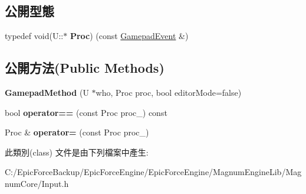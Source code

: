 \subsection*{公開型態}
\begin{DoxyCompactItemize}
\item 
typedef void(U\+::$\ast$ {\bfseries Proc}) (const \hyperlink{class_magnum_1_1_input_1_1_gamepad_event}{Gamepad\+Event} \&)\hypertarget{class_magnum_1_1_input_1_1_gamepad_method_a84febdcd685fe1849f89a8ea02c7f0b6}{}\label{class_magnum_1_1_input_1_1_gamepad_method_a84febdcd685fe1849f89a8ea02c7f0b6}

\end{DoxyCompactItemize}
\subsection*{公開方法(Public Methods)}
\begin{DoxyCompactItemize}
\item 
{\bfseries Gamepad\+Method} (U $\ast$who, Proc proc, bool editor\+Mode=false)\hypertarget{class_magnum_1_1_input_1_1_gamepad_method_a7a020e90917ec1bea728fe40c39ee213}{}\label{class_magnum_1_1_input_1_1_gamepad_method_a7a020e90917ec1bea728fe40c39ee213}

\item 
bool {\bfseries operator==} (const Proc proc\+\_\+) const \hypertarget{class_magnum_1_1_input_1_1_gamepad_method_a4e03f2982b4e8f873a5fbf25daa9d55f}{}\label{class_magnum_1_1_input_1_1_gamepad_method_a4e03f2982b4e8f873a5fbf25daa9d55f}

\item 
Proc \& {\bfseries operator=} (const Proc proc\+\_\+)\hypertarget{class_magnum_1_1_input_1_1_gamepad_method_a900c9b56546106cafdeaa0335ddecb68}{}\label{class_magnum_1_1_input_1_1_gamepad_method_a900c9b56546106cafdeaa0335ddecb68}

\end{DoxyCompactItemize}


此類別(class) 文件是由下列檔案中產生\+:\begin{DoxyCompactItemize}
\item 
C\+:/\+Epic\+Force\+Backup/\+Epic\+Force\+Engine/\+Epic\+Force\+Engine/\+Magnum\+Engine\+Lib/\+Magnum\+Core/Input.\+h\end{DoxyCompactItemize}
